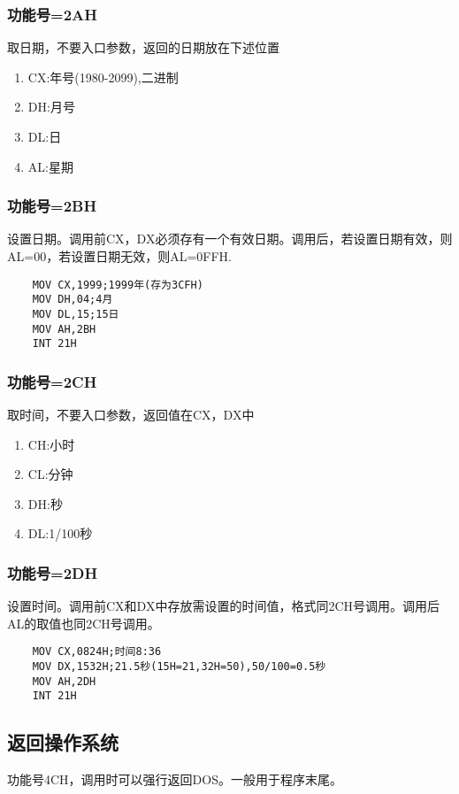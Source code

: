 \subsubsection{功能号=2AH}
取日期，不要入口参数，返回的日期放在下述位置
\begin{enumerate}
    \item CX:年号(1980-2099),二进制
    \item DH:月号
    \item DL:日
    \item AL:星期
\end{enumerate}
\subsubsection{功能号=2BH}
设置日期。调用前CX，DX必须存有一个有效日期。调用后，若设置日期有效，则AL=00，若设置日期无效，则AL=0FFH.
\begin{lstlisting}
    MOV CX,1999;1999年(存为3CFH)
    MOV DH,04;4月
    MOV DL,15;15日
    MOV AH,2BH 
    INT 21H
\end{lstlisting}
\subsubsection{功能号=2CH}
取时间，不要入口参数，返回值在CX，DX中
\begin{enumerate}
    \item CH:小时
    \item CL:分钟
    \item DH:秒
    \item DL:1/100秒
\end{enumerate}
\subsubsection{功能号=2DH}
设置时间。调用前CX和DX中存放需设置的时间值，格式同2CH号调用。调用后AL的取值也同2CH号调用。
\begin{lstlisting}
    MOV CX,0824H;时间8:36
    MOV DX,1532H;21.5秒(15H=21,32H=50),50/100=0.5秒
    MOV AH,2DH 
    INT 21H
\end{lstlisting}
\subsection{返回操作系统}
功能号4CH，调用时可以强行返回DOS。一般用于程序末尾。